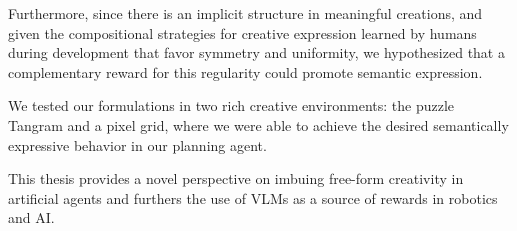 
Furthermore, since there is an implicit structure in meaningful creations, and given the compositional strategies for creative expression learned by humans during development \citep{symmetry,compositional} that favor symmetry and uniformity, we hypothesized that a complementary reward for this regularity \citep{rair} could promote semantic expression.

We tested our formulations in two rich creative environments: the puzzle Tangram and a pixel grid, where we were able to achieve the desired semantically expressive behavior in our planning agent.

This thesis provides a novel perspective on imbuing free-form creativity in artificial agents and furthers the use of VLMs as a source of rewards in robotics and AI.
